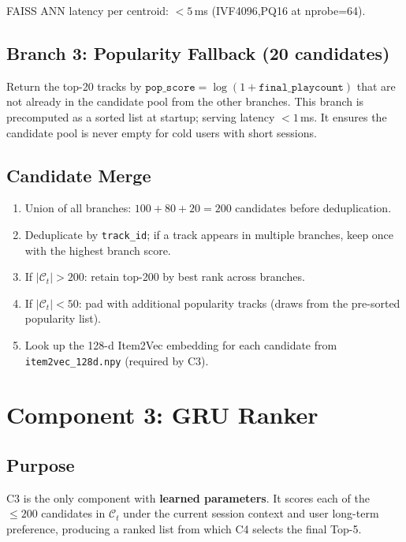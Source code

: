 \documentclass[11pt]{article}
\begin{document}
FAISS ANN latency per centroid: $< 5$\,ms (IVF4096,PQ16 at nprobe=64).

\subsection{Branch 3: Popularity Fallback (20 candidates)}

Return the top-20 tracks by $\texttt{pop\_score} = \log(1 + \texttt{final\_playcount})$
that are not already in the candidate pool from the other branches.
This branch is precomputed as a sorted list at startup; serving latency
$< 1$\,ms. It ensures the candidate pool is never empty for cold users
with short sessions.

\subsection{Candidate Merge}

\begin{enumerate}
  \item Union of all branches: $100 + 80 + 20 = 200$ candidates before deduplication.
  \item Deduplicate by \texttt{track\_id}; if a track appears in multiple
        branches, keep once with the highest branch score.
  \item If $|\mathcal{C}_t| > 200$: retain top-200 by best rank across branches.
  \item If $|\mathcal{C}_t| < 50$: pad with additional popularity tracks
        (draws from the pre-sorted popularity list).
  \item Look up the 128-d Item2Vec embedding for each candidate from
        \texttt{item2vec\_128d.npy} (required by C3).
\end{enumerate}

\section{Component 3: GRU Ranker}

\subsection{Purpose}

C3 is the only component with \textbf{learned parameters}. It scores each
of the $\le 200$ candidates in $\mathcal{C}_t$ under the current session
context and user long-term preference, producing a ranked list from which
C4 selects the final Top-5.
\end{document}
